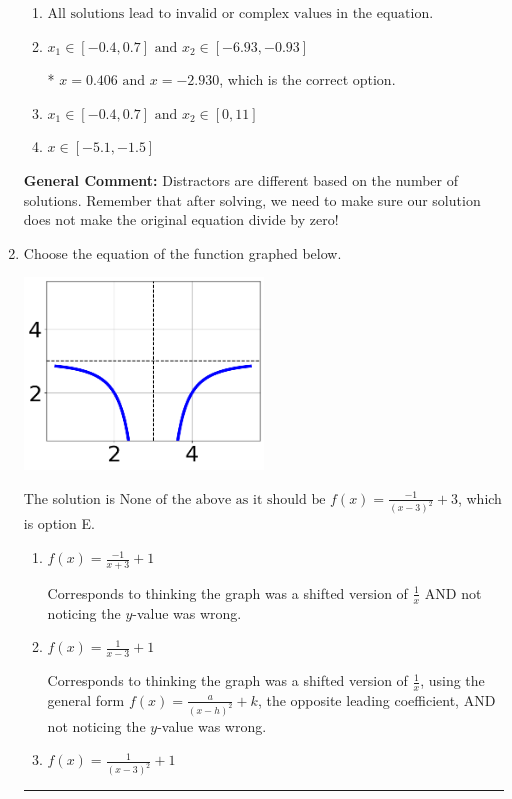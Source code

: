 \documentclass{extbook}[14pt]
\newcommand{\litem}[1]{\item #1

\rule{\textwidth}{0.4pt}}
\begin{document}
\begin{enumerate}
{\begin{enumerate}[label=\Alph*.]
\item \( \text{All solutions lead to invalid or complex values in the equation.} \)


\item \( x_1 \in [-0.4, 0.7] \text{ and } x_2 \in [-6.93,-0.93] \)

* $x = 0.406 \text{ and } x = -2.930$, which is the correct option.
\item \( x_1 \in [-0.4, 0.7] \text{ and } x_2 \in [0,11] \)


\item \( x \in [-5.1,-1.5] \)


\end{enumerate}

\textbf{General Comment:} Distractors are different based on the number of solutions. Remember that after solving, we need to make sure our solution does not make the original equation divide by zero!
}
\litem{
Choose the equation of the function graphed below.

\begin{center}
    \includegraphics[width=0.5\textwidth]{../Figures/rationalGraphToEquationC.png}
\end{center}


The solution is \( \text{None of the above as it should be } f(x) = \frac{-1}{(x - 3)^2} + 3 \), which is option E.\begin{enumerate}[label=\Alph*.]
\item \( f(x) = \frac{-1}{x + 3} + 1 \)

Corresponds to thinking the graph was a shifted version of $\frac{1}{x}$ AND not noticing the $y$-value was wrong.
\item \( f(x) = \frac{1}{x - 3} + 1 \)

Corresponds to thinking the graph was a shifted version of $\frac{1}{x}$, using the general form $f(x) = \frac{a}{(x-h)^2}+k$, the opposite leading coefficient, AND not noticing the $y$-value was wrong.
\item \( f(x) = \frac{1}{(x - 3)^2} + 1 \)


\end{enumerate}}
\end{enumerate}
\end{document}
